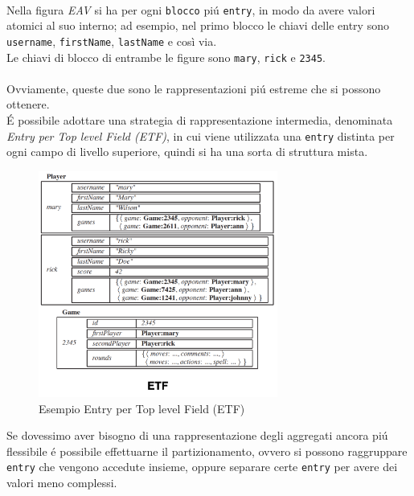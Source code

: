 \\
Nella figura \emph{EAV} si ha per ogni \texttt{blocco} piú \texttt{entry}, in modo da avere valori atomici al suo interno; ad esempio, nel primo blocco
le chiavi delle entry sono \texttt{username}, \texttt{firstName}, \texttt{lastName} e così via.\\
Le chiavi di blocco di entrambe le figure sono \texttt{mary}, \texttt{rick} e \texttt{2345}.
\\
\\
Ovviamente, queste due sono le rappresentazioni piú estreme che si possono ottenere.\\
É possibile adottare una strategia di rappresentazione intermedia, denominata \emph{Entry per Top level Field (ETF)}, in cui
viene utilizzata una \texttt{entry} distinta per ogni campo di livello superiore, quindi si ha una sorta di struttura mista.

\begin{figure}[H]
    \begin{center}
        \includegraphics[width=0.7\textwidth]{img/etf}
    \end{center}
\caption{Esempio Entry per Top level Field (ETF)}
\end{figure}
Se dovessimo aver bisogno di una rappresentazione degli aggregati ancora piú flessibile é possibile effettuarne il partizionamento,
ovvero si possono raggruppare \texttt{entry} che vengono accedute insieme, oppure separare certe \texttt{entry} per avere dei
valori meno complessi.

